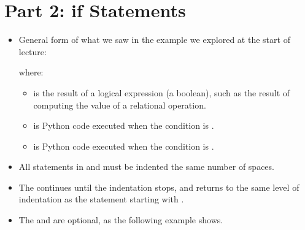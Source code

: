 \documentclass[letterpaper,10pt,english]{sphinxmanual}
\begin{document}
\section{Part 2: if Statements}
\label{\detokenize{lecture_notes/lec06_conditionals1:part-2-if-statements}}\begin{itemize}
\item {} 
General form of what we saw in the example we explored at the start
of lecture:

\begin{sphinxVerbatim}[commandchars=\\\{\}]
 
\end{sphinxVerbatim}

where:
\begin{itemize}
\item {} 
 is the result of a logical expression (a boolean), such as the
result of computing the value of a relational operation.

\item {} 
 is Python code executed when the condition is .

\item {} 
 is Python code executed when the condition is
.

\end{itemize}

\item {} 
All statements in  and  must be indented the
same number of spaces.

\item {} 
The  continues until the indentation stops, and returns to
the same level of indentation as the statement starting with .

\item {} 
The  and  are optional, as the following example
shows.

\end{itemize}
\end{document}
